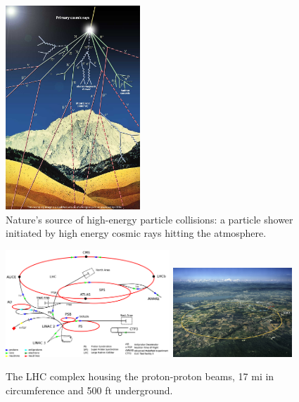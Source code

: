 \begin{figure}[hb!]
\centering
\includegraphics[width=0.45\textwidth]{figs/cosmic-rays.jpg}
\caption{Nature's source of high-energy particle collisions: a particle shower initiated by high energy cosmic rays hitting the atmosphere.}
\label{fig:cosmicrays}
\end{figure}

\begin{figure}[hb!]
\centering
\includegraphics[width=0.55\textwidth]{figs/lhcschematic.png}
\includegraphics[width=0.4\textwidth]{figs/lhc.jpg}
\caption{The LHC complex housing the proton-proton beams, 17 mi in circumference and 500 ft underground.}
\label{fig:lhc}
\end{figure}
